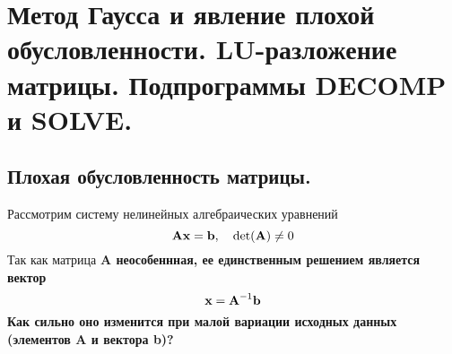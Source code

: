 \section{Метод Гаусса и явление плохой обусловленности. \textbf{LU}-разложение матрицы. Подпрограммы \textbf{DECOMP} и \textbf{SOLVE}.}\label{sec:ch20}

\subsection{Плохая обусловленность матрицы.}
Рассмотрим систему нелинейных алгебраических уравнений
\begin{equation}
    \bf{A}\bf{x} = \bf{b}, \quad \det (\bf{A}) \neq 0 \label{eq:nonlinear_algebraic_equation}
\end{equation}
Так как матрица \bf{A} неособеннная, ее единственным решением является вектор
\begin{equation}
    \bf{x} = \bf{A}^{-1}\bf{b}
\end{equation}
Как сильно оно изменится при малой вариации исходных данных (элементов \bf{A} и вектора \bf{b})?

